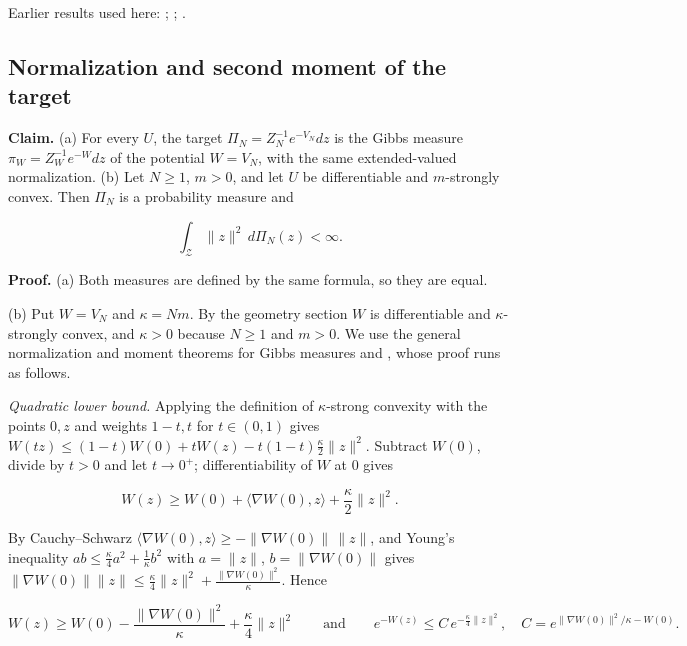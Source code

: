 \documentclass[11pt,a4paper]{report}
\begin{document}
Earlier results used here: \cite[Section~3.26]{LangevinLean2026ULASC}; \cite[Section~3.27]{LangevinLean2026ULASC}; \cite[Section~3.21]{LangevinLean2026ULASC}.
\subsection{\texorpdfstring{Normalization and second moment of the target}{Normalization and second moment of the target}}
\label{report-step-IPLA-Foundations-lean-1}


\textbf{Claim.} (a) For every \(U\), the target \(\Pi_N=Z_N^{-1}e^{-V_N}dz\) is the Gibbs measure \(\pi_W=Z_W^{-1}e^{-W}dz\) of the potential \(W=V_N\), with the same extended-valued normalization. (b) Let \(N\ge1\), \(m>0\), and let \(U\) be differentiable and \(m\)-strongly convex. Then \(\Pi_N\) is a probability measure and


\[\int_{\mathcal Z}\|z\|^2\,d\Pi_N(z)<\infty .\]


\textbf{Proof.} (a) Both measures are defined by the same formula, so they are equal.




(b) Put \(W=V_N\) and \(\kappa=Nm\). By the geometry section \(W\) is differentiable and \(\kappa\)-strongly convex, and \(\kappa>0\) because \(N\ge1\) and \(m>0\). We use the general normalization and moment theorems for Gibbs measures \cite[Section~3.26.13]{LangevinLean2026ULASC} and \cite[Section~3.26.15]{LangevinLean2026ULASC}, whose proof runs as follows.




\emph{Quadratic lower bound.} Applying the definition of \(\kappa\)-strong convexity with the points \(0,z\) and weights \(1-t,t\) for \(t\in(0,1)\) gives \(W(tz)\le(1-t)W(0)+tW(z)-t(1-t)\frac\kappa2\|z\|^2\). Subtract \(W(0)\), divide by \(t>0\) and let \(t\to0^+\); differentiability of \(W\) at \(0\) gives


\[W(z)\ge W(0)+\langle\nabla W(0),z\rangle+\frac\kappa2\|z\|^2 .\]


By Cauchy–Schwarz \(\langle\nabla W(0),z\rangle\ge-\|\nabla W(0)\|\,\|z\|\), and Young's inequality \(ab\le\frac\kappa4a^2+\frac1\kappa b^2\) with \(a=\|z\|\), \(b=\|\nabla W(0)\|\) gives \(\|\nabla W(0)\|\|z\|\le\frac\kappa4\|z\|^2+\frac{\|\nabla W(0)\|^2}\kappa\). Hence


\[W(z)\ge W(0)-\frac{\|\nabla W(0)\|^2}\kappa+\frac\kappa4\|z\|^2\qquad\text{and}\qquad e^{-W(z)}\le C\,e^{-\frac\kappa4\|z\|^2},\quad C=e^{\|\nabla W(0)\|^2/\kappa-W(0)} .\]
\end{document}
